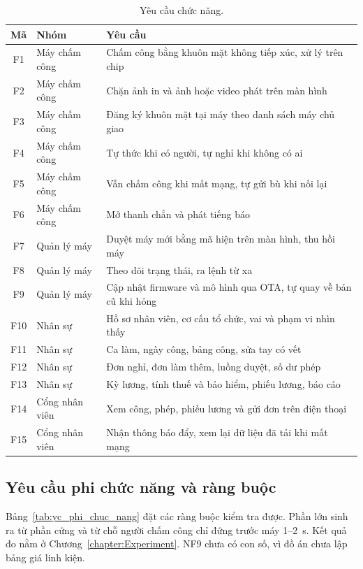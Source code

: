 \documentclass[../DoAn.tex]{subfiles}
\begin{document}
\begin{table}[!htb]
\centering
\small
\caption{Yêu cầu chức năng.}
\label{tab:yc_chuc_nang}
\begin{tabular}{|c|L{3.2cm}|L{9.6cm}|}
\hline
\textbf{Mã} & \textbf{Nhóm} & \textbf{Yêu cầu} \\
\hline
F1 & Máy chấm công & Chấm công bằng khuôn mặt không tiếp xúc, xử lý trên chip \\
\hline
F2 & Máy chấm công & Chặn ảnh in và ảnh hoặc video phát trên màn hình \\
\hline
F3 & Máy chấm công & Đăng ký khuôn mặt tại máy theo danh sách máy chủ giao \\
\hline
F4 & Máy chấm công & Tự thức khi có người, tự nghỉ khi không có ai \\
\hline
F5 & Máy chấm công & Vẫn chấm công khi mất mạng, tự gửi bù khi nối lại \\
\hline
F6 & Máy chấm công & Mở thanh chắn và phát tiếng báo \\
\hline
F7 & Quản lý máy & Duyệt máy mới bằng mã hiện trên màn hình, thu hồi máy \\
\hline
F8 & Quản lý máy & Theo dõi trạng thái, ra lệnh từ xa \\
\hline
F9 & Quản lý máy & Cập nhật firmware và mô hình qua OTA, tự quay về bản cũ khi hỏng \\
\hline
F10 & Nhân sự & Hồ sơ nhân viên, cơ cấu tổ chức, vai và phạm vi nhìn thấy \\
\hline
F11 & Nhân sự & Ca làm, ngày công, bảng công, sửa tay có vết \\
\hline
F12 & Nhân sự & Đơn nghỉ, đơn làm thêm, luồng duyệt, số dư phép \\
\hline
F13 & Nhân sự & Kỳ lương, tính thuế và bảo hiểm, phiếu lương, báo cáo \\
\hline
F14 & Cổng nhân viên & Xem công, phép, phiếu lương và gửi đơn trên điện thoại \\
\hline
F15 & Cổng nhân viên & Nhận thông báo đẩy, xem lại dữ liệu đã tải khi mất mạng \\
\hline
\end{tabular}
\end{table}

\subsection{Yêu cầu phi chức năng và ràng buộc}
\label{section:3.1.3}

Bảng~\ref{tab:yc_phi_chuc_nang} đặt các ràng buộc kiểm tra được. Phần lớn sinh ra từ
phần cứng và từ chỗ người chấm công chỉ đứng trước máy 1--2~s. Kết quả đo nằm ở
Chương~\ref{chapter:Experiment}. NF9 chưa có con số, vì đồ án chưa lập bảng giá linh
kiện.
\end{document}
